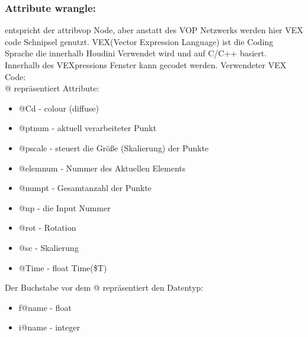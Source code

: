 \documentclass[paper=a4,fontsize=12pt,ngerman]{scrartcl}
\begin{document}
 	\subsubsection*{Attribute wrangle:}
 	entspricht der attribvop Node, aber anstatt des VOP Netzwerks werden hier VEX code Schnipsel genutzt. VEX(Vector Expression Language) ist die Coding Sprache die innerhalb Houdini Verwendet wird und auf C/C++ basiert.
 	Innerhalb des VEXpressions Fenster kann gecodet werden.
 	Verwendeter VEX Code:\\
 	@ repräsentiert Attribute:
 	\begin{itemize}
 		\item @Cd - colour (diffuse) 
 		\item @ptnum - aktuell verarbeiteter Punkt
 		\item @pscale - steuert die Größe (Skalierung) der Punkte
 		\item @elemnum - Nummer des Aktuellen Elements
 		\item @numpt - Gesamtanzahl der Punkte
 		\item @np - die Input Nummer
 		\item @rot - Rotation
 		\item @sc - Skalierung
 		\item @Time - float Time(\$T)
 	\end{itemize}
 	
 	Der Buchstabe vor dem @ repräsentiert den Datentyp: 
 	\begin{itemize}
 		\item f@name - float
 		\item i@name - integer
 	\end{itemize}
 	
\end{document}
